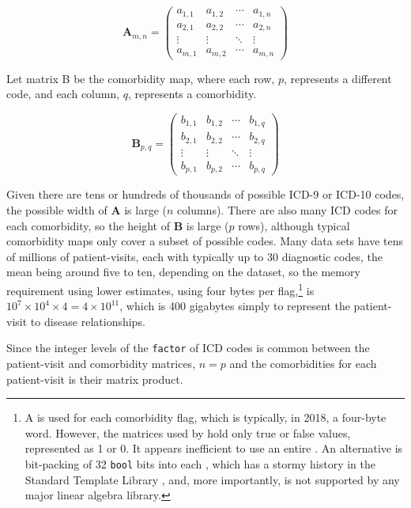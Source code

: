 \documentclass[article]{jss}
\begin{document}
\[\boldsymbol{A}_{m,n} =
\begin{pmatrix}
a_{1,1} & a_{1,2} & \cdots & a_{1,n} \\
a_{2,1} & a_{2,2} & \cdots & a_{2,n} \\
\vdots  & \vdots  & \ddots & \vdots  \\
a_{m,1} & a_{m,2} & \cdots & a_{m,n}
\end{pmatrix}\]\label{eq:A}

Let matrix B be the comorbidity map, where each row, \(p\), represents a
different code, and each column, \(q\), represents a comorbidity.

\[ \boldsymbol{B}_{p,q} =
\begin{pmatrix}
b_{1,1} & b_{1,2} & \cdots & b_{1,q} \\
b_{2,1} & b_{2,2} & \cdots & b_{2,q} \\
\vdots  & \vdots  & \ddots & \vdots  \\
b_{p,1} & b_{p,2} & \cdots & b_{p,q}
\end{pmatrix}\]\label{eq:B}

Given there are tens or hundreds of thousands of possible ICD-9 or
ICD-10 codes, the possible width of \(\boldsymbol{A}\) is large (\(n\)
columns). There are also many ICD codes for each comorbidity, so the
height of \(\boldsymbol{B}\) is large (\(p\) rows), although typical
comorbidity maps only cover a subset of possible codes. Many data sets
have tens of millions of patient-visits, each with typically up to 30
diagnostic codes, the mean being around five to ten, depending on the
dataset, so the memory requirement using lower estimates, using four
bytes per flag,\footnote{A   is used for each
  comorbidity flag, which is typically, in 2018, a four-byte word.
  However, the matrices used by  hold only true or false
  values, represented as 1 or 0. It appears inefficient to use an entire
  . An alternative is bit-packing of 32 \texttt{bool} bits
  into each , which has a stormy history in the 
  Standard Template Library \citep{Jarvi_Algorithm_2006}, and, more
  importantly, is not supported by any major linear algebra library.} is
\(10^7 \times 10^4 \times 4 = 4 \times 10^{11}\), which is 400 gigabytes
simply to represent the patient-visit to disease relationships.

Since the integer levels of the \texttt{factor} of ICD codes is common
between the patient-visit and comorbidity matrices, \(n = p\) and the
comorbidities for each patient-visit is their matrix product.
\end{document}
